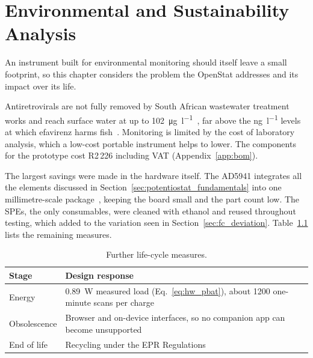 \chapter{Environmental and Sustainability Analysis}
\label{chap:environmental}

An instrument built for environmental monitoring should itself leave a small
footprint, so this chapter considers the problem the OpenStat addresses
and its impact over its life.

Antiretrovirals are not fully removed by South African wastewater treatment
works and reach surface water at up to
\SI{102}{\micro\gram\per\litre}~\cite{vogt_arv_sa_waters}, far above the
\si{\nano\gram\per\litre} levels at which efavirenz harms fish~\cite{env_robson2017}.
Monitoring is limited by the cost of laboratory analysis, which a low-cost
portable instrument helps to lower. The components for the prototype cost
R2\,226 including VAT (Appendix~\ref{app:bom}).

The largest savings were made in the hardware itself. The AD5941 integrates all the elements discussed in Section~\ref{sec:potentiostat_fundamentals} into one
millimetre-scale package~\cite{ad5941_ds},
keeping the board small and the part count low. The SPEs, the only
consumables, were cleaned with ethanol and reused throughout
testing, which added to the variation seen in Section~\ref{sec:fc_deviation}. Table~\ref{tab:env_lifecycle} lists the remaining measures.

\begin{table}[htbp]
  \caption{Further life-cycle measures.}
  \label{tab:env_lifecycle}
  \centering
  \small
  \begin{tabularx}{\textwidth}{@{}l >{\raggedright\arraybackslash}X@{}}
    \toprule
    \textbf{Stage} & \textbf{Design response} \\
    \midrule
    Energy       & \SI{0.89}{\watt} measured load
                   (Eq.~\eqref{eq:hw_pbat}), about \num{1200} one-minute scans per charge \\
    Obsolescence & Browser and on-device interfaces, so no companion app can become unsupported \\
    End of life  & Recycling under the EPR Regulations~\cite{env_epr2020} \\
    \bottomrule
  \end{tabularx}
\end{table}

